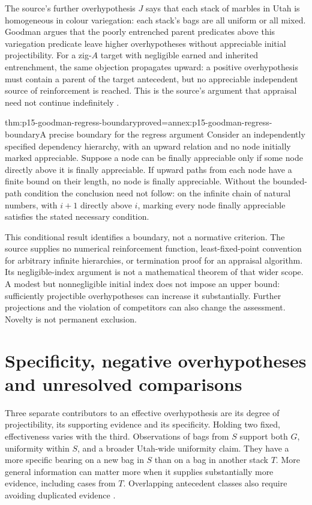 The source's further overhypothesis $J$ says that each stack of marbles
in Utah is homogeneous in colour variegation: each stack's bags are all
uniform or all mixed. Goodman argues that the poorly entrenched parent
predicates above this variegation predicate leave higher overhypotheses
without appreciable initial projectibility. For a zig-$A$ target with
negligible earned and inherited entrenchment, the same objection propagates
upward: a positive overhypothesis must contain a parent of the target
antecedent, but no appreciable independent source of reinforcement is
reached. This is the source's argument that appraisal need not continue
indefinitely \parencite[pp.~112--114]{Goodman1983FourthProjection}.

\begin{hblemma}{thm:p15-goodman-regress-boundary}{proved=annex:p15-goodman-regress-boundary}{A precise boundary for the regress argument}
Consider an independently specified dependency hierarchy, with an upward
relation and no node initially marked appreciable. Suppose a node can be
finally appreciable only if some node directly above it is finally
appreciable. If upward paths from each node have a finite bound on their
length, no node is finally appreciable. Without the bounded-path condition
the conclusion need not follow: on the infinite chain of natural numbers,
with $i+1$ directly above $i$, marking every node finally appreciable
satisfies the stated necessary condition.
\end{hblemma}

This conditional result identifies a boundary, not a normative criterion.
The source supplies no numerical reinforcement function, least-fixed-point
convention for arbitrary infinite hierarchies, or termination proof for an
appraisal algorithm. Its negligible-index argument is not a mathematical
theorem of that wider scope. A modest but nonnegligible initial index does
not impose an upper bound: sufficiently projectible overhypotheses can
increase it substantially. Further projections and the violation of
competitors can also change the assessment. Novelty is not permanent exclusion.

\section{Specificity, negative overhypotheses and unresolved comparisons}
\label{sec:p15-goodman-negative-overhypotheses}

Three separate contributors to an effective overhypothesis are its degree
of projectibility, its supporting evidence and its specificity. Holding
two fixed, effectiveness varies with the third. Observations of bags from
$S$ support both $G$, uniformity within $S$, and a broader Utah-wide
uniformity claim. They have a more specific bearing on a new bag in $S$
than on a bag in another stack $T$. More general information can matter
more when it supplies substantially more evidence, including cases from
$T$. Overlapping antecedent classes also require avoiding duplicated
evidence \parencite[pp.~114--116 and n.~21]{Goodman1983FourthProjection}.

